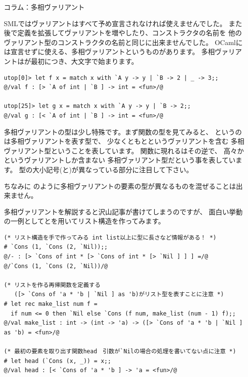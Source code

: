 \documentclass[11pt,a4paper]{jarticle}
\begin{document}
\begin{itembox}[l]{コラム：多相ヴァリアント}

SMLではヴァリアントはすべて予め宣言されなければ使えませんでした。
また後で定義を拡張してヴァリアントを増やしたり、コンストラクタの名前を
他のヴァリアント型のコンストラクタの名前と同じに出来ませんでした。
OCamlには宣言せずに使える、多相ヴァリアントというものがあります。
多相ヴァリアントはが最初につき、大文字で始まります。

\begin{lstlisting}[caption=多相ヴァリアント,label=code:poly-varinat]
utop[0]> let f x = match x with `A y -> y | `B -> 2 | _ -> 3;;
@/val f : [> `A of int | `B ] -> int = <fun>/@

utop[25]> let g x = match x with `A y -> y | `B -> 2;;
@/val g : [< `A of int | `B ] -> int = <fun>/@
\end{lstlisting}

多相ヴァリアントの型は少し特殊です。まず関数の型を見てみると、
\prog{[> `A of int | `B ]}というのは多相ヴァリアントを表す型で、
少なくともとというヴァリアントを含む
多相ヴァリアント型ということを表しています。
関数に現れる\prog{[< `A of int | `B ]}はその逆で、
高々かというヴァリアントしか含まない
多相ヴァリアント型だという事を表しています。
型の大小記号(\prog{>}と\prog{<})が異なっている部分に注目して下さい。

ちなみに
のように多相ヴァリアントの要素の型が異なるものを混ぜることは出来ません。

多相ヴァリアントを解説すると沢山記事が書けてしまうのですが、
面白い挙動の一例としてとを用いてリスト構造を作ってみます。

\begin{lstlisting}[caption=多相ヴァリアントを用いたリスト構造(ocamlコード)]
(* リスト構造を手で作ってみる int list以上に型に長さなど情報がある！ *)
# `Cons (1, `Cons (2, `Nil));;
@/- : [> `Cons of int * [> `Cons of int * [> `Nil ] ] ] =/@
@/`Cons (1, `Cons (2, `Nil))/@

(* リストを作る再帰関数を定義する
   ([> `Cons of 'a * 'b | `Nil ] as 'b)がリスト型を表すことに注意 *)
# let rec make_list num f =
  if num <= 0 then `Nil else `Cons (f num, make_list (num - 1) f);;
@/val make_list : int -> (int -> 'a) -> ([> `Cons of 'a * 'b | `Nil ] as 'b) = <fun>/@

(* 最初の要素を取り出す関数head　引数が`Nilの場合の処理を書いてない点に注意 *)
# let head (`Cons (x, _)) = x;;
@/val head : [< `Cons of 'a * 'b ] -> 'a = <fun>/@


\end{lstlisting}
\end{itembox}
\end{document}
